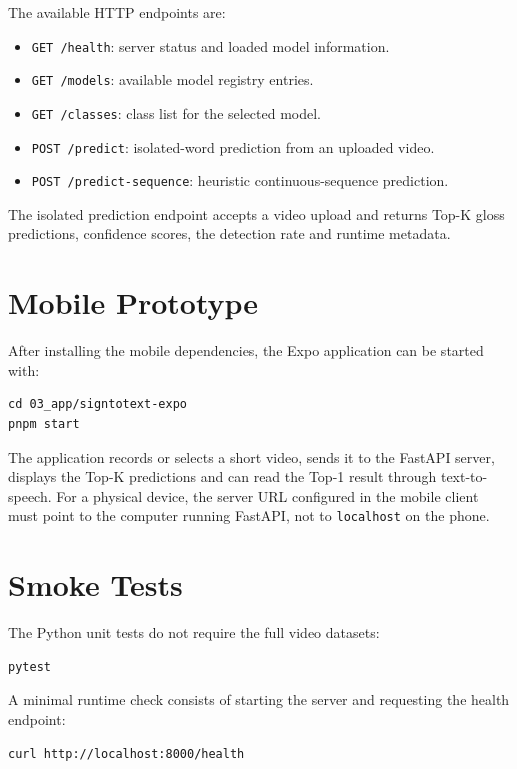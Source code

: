 The available HTTP endpoints are:

\begin{itemize}
    \item \texttt{GET /health}: server status and loaded model information.
    \item \texttt{GET /models}: available model registry entries.
    \item \texttt{GET /classes}: class list for the selected model.
    \item \texttt{POST /predict}: isolated-word prediction from an uploaded video.
    \item \texttt{POST /predict-sequence}: heuristic continuous-sequence prediction.
\end{itemize}

The isolated prediction endpoint accepts a video upload and returns Top-K gloss predictions,
confidence scores, the detection rate and runtime metadata.

\section{Mobile Prototype}
\label{app:user_manual_mobile}

After installing the mobile dependencies, the Expo application can be started with:

\begin{verbatim}
cd 03_app/signtotext-expo
pnpm start
\end{verbatim}

The application records or selects a short video, sends it to the FastAPI server, displays the
Top-K predictions and can read the Top-1 result through text-to-speech. For a physical device, the
server URL configured in the mobile client must point to the computer running FastAPI, not to
\texttt{localhost} on the phone.

\section{Smoke Tests}
\label{app:user_manual_smoke_tests}

The Python unit tests do not require the full video datasets:

\begin{verbatim}
pytest
\end{verbatim}

A minimal runtime check consists of starting the server and requesting the health endpoint:

\begin{verbatim}
curl http://localhost:8000/health
\end{verbatim}

